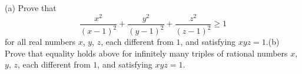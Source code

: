 (a) Prove that\[\frac {x^{2}}{\left(x - 1\right)^{2}} + \frac {y^{2}}{\left(y - 1\right)^{2}} + \frac {z^{2}}{\left(z - 1\right)^{2}} \geq 1\] for all real numbers $x$,  $y$,  $z$,  each different from $1$,  and satisfying $xyz=1$.(b) Prove that equality holds above for infinitely many triples of rational numbers $x$,  $y$,  $z$,  each different from $1$,  and satisfying $xyz=1$.